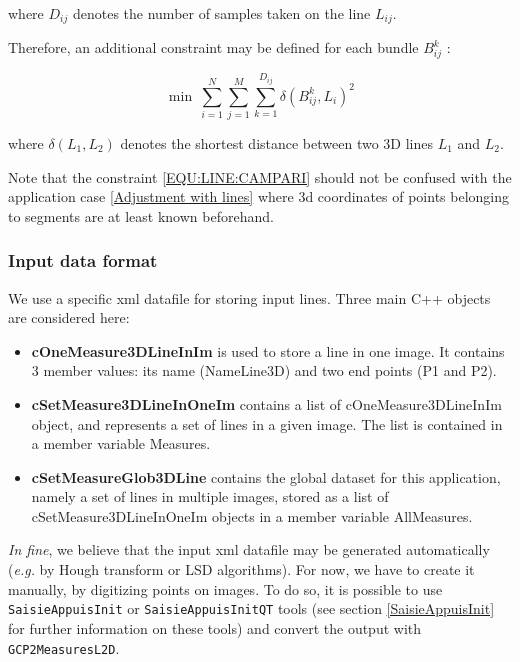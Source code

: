 \noindent where $D_{ij}$ denotes the number of samples taken on the line $L_{ij}$. \newline

\noindent Therefore, an additional constraint may be defined for each bundle $B_{ij}^k$ : \newline

\begin{equation}
\min ~ \sum_{i=1}^{N} \sum_{j=1}^{M} \sum_{k=1}^{D_{ij}} \delta(B_{ij}^k,L_i)^2 \label{EQU:LINE:CAMPARI}
\end{equation}
\vspace{0.2cm}

\noindent where $\delta(L_1, L_2)$ denotes the shortest distance between two 3D lines $L_1$ and $L_2$. \newline

\noindent Note that the constraint \ref{EQU:LINE:CAMPARI} should not be confused with the application case \ref{Adjustment with lines} where 3d coordinates of points belonging to segments are at least known beforehand. \newline

\subsubsection{Input data format}

We use a specific xml datafile for storing input lines. Three main C++ objects are considered here: \newline

\begin{itemize}
	\item \textbf{cOneMeasure3DLineInIm} is used to store a line in one image. It contains 3 member values: its name (NameLine3D) and two end points (P1 and P2). \newline
	\item \textbf{cSetMeasure3DLineInOneIm} contains a list of cOneMeasure3DLineInIm object, and represents a set of lines in a given image. The list is contained in a member variable Measures. \newline
	\item \textbf{cSetMeasureGlob3DLine} contains the global dataset for this application, namely a set of lines in multiple images, stored as a list of cSetMeasure3DLineInOneIm objects in a member variable AllMeasures. \newline
\end{itemize}

\noindent \textit{In fine}, we believe that the input xml datafile may be generated automatically (\textit{e.g.} by Hough transform or LSD algorithms). For now, we have to create it manually, by digitizing points on images. To do so, it is possible to use \texttt{SaisieAppuisInit} or \texttt{SaisieAppuisInitQT} tools (see section \ref{SaisieAppuisInit} for further information on these tools) and convert the output with \texttt{GCP2MeasuresL2D}. \newline

